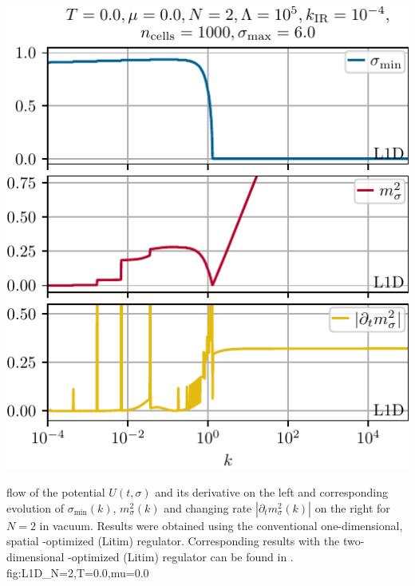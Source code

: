 	{%
		\includegraphics[width=\subcaptionFigureWidth]{gn/figures/k_L1D_N=2,T=0.0,mu=0.0.pdf}%
		\captionsetup{font=footnotesize,width=\subcaptionFigureWidth}%
		\caption{%
			\frg{} flow of the minimum $\sigma_{\mathrm{min}} ( k )$ (upper panel), the squared curvature mass $m_\sigma^2 ( k ) = \partial_\sigma u ( t, \sigma )$ (middle panel), and the relative change of the squared curvature mass $| \partial_t m_\sigma^2 ( k ) |$ (lower panel) according to \cref{eq:changing_rate_mass} plotted as functions of the \rgscale{} $k ( t )$ in vacuum ($T = \mu =0$).
		}%
		\label{fig:k_L1D_N2T=0mu0}%
	}
	{%
		\frg{} flow of the potential $U(t,\sigma)$ and its derivative on the left  and corresponding evolution of $\sigma_{\mathrm{min}} ( k )$, $m_\sigma^2 ( k )$
		and changing rate $| \partial_t m_\sigma^2 ( k ) |$ on the right  for $N=2$ in vacuum.
		Results were obtained using the conventional one-dimensional, spatial \lpa{}-optimized (Litim) regulator.
		Corresponding results with the two-dimensional \lpa{}-optimized (Litim) regulator can be found in \gnAppVacFlow{}.
	}%
	{fig:L1D_N=2,T=0.0,mu=0.0}%

